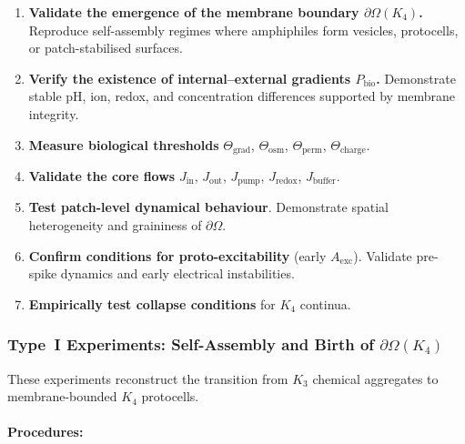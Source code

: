 \begin{enumerate}
    \item \textbf{Validate the emergence of the membrane boundary 
          $\partial\Omega(K_4)$.}  
          Reproduce self-assembly regimes where amphiphiles form vesicles, 
          protocells, or patch-stabilised surfaces.

    \item \textbf{Verify the existence of internal--external gradients 
          $P_{\mathrm{bio}}$.}  
          Demonstrate stable pH, ion, redox, and concentration 
          differences supported by membrane integrity.

    \item \textbf{Measure biological thresholds} $\Theta_{\mathrm{grad}}$, 
          $\Theta_{\mathrm{osm}}$, $\Theta_{\mathrm{perm}}$, 
          $\Theta_{\mathrm{charge}}$.

    \item \textbf{Validate the core flows} 
          $J_{\mathrm{in}}$, $J_{\mathrm{out}}$, $J_{\mathrm{pump}}$, 
          $J_{\mathrm{redox}}$, $J_{\mathrm{buffer}}$.

    \item \textbf{Test patch-level dynamical behaviour}.  
          Demonstrate spatial heterogeneity and graininess of $\partial\Omega$.

    \item \textbf{Confirm conditions for proto-excitability} (early $A_{\mathrm{exc}}$).  
          Validate pre-spike dynamics and early electrical instabilities.

    \item \textbf{Empirically test collapse conditions} for $K_4$ continua.
\end{enumerate}



\subsubsection{Type~I Experiments: Self-Assembly and Birth of \texorpdfstring{$\partial\Omega(K_4)$}{\partial\Omega(K_4)}}

These experiments reconstruct the transition from $K_3$ chemical 
aggregates to membrane-bounded $K_4$ protocells.

\paragraph{Procedures:}

